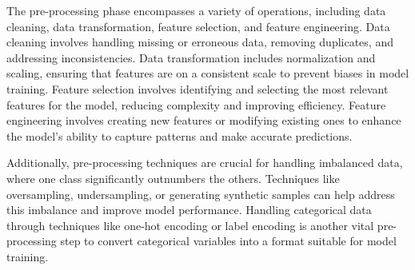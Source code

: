 \documentclass[12pt,a4paper,openright,twoside]{book}
\begin{document}
The pre-processing phase encompasses a variety of operations, including data cleaning, data transformation, feature selection, and feature engineering. Data cleaning involves handling missing or erroneous data, removing duplicates, and addressing inconsistencies. Data transformation includes normalization and scaling, ensuring that features are on a consistent scale to prevent biases in model training. Feature selection involves identifying and selecting the most relevant features for the model, reducing complexity and improving efficiency. Feature engineering involves creating new features or modifying existing ones to enhance the model's ability to capture patterns and make accurate predictions. 

Additionally, pre-processing techniques are crucial for handling imbalanced data, where one class significantly outnumbers the others. Techniques like oversampling, undersampling, or generating synthetic samples can help address this imbalance and improve model performance. Handling categorical data through techniques like one-hot encoding or label encoding is another vital pre-processing step to convert categorical variables into a format suitable for model training.
\end{document}
